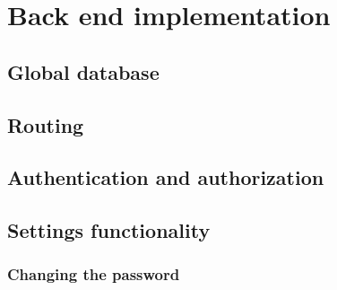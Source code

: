 \chapter{Back end implementation}
\label{ch:back_end_implementation}





\section{Global database}
\label{sec:global_database}





\section{Routing}
\label{sec:routing}





\section{Authentication and authorization}
\label{sec:authentication_and_authorization}





\section{Settings functionality}
\label{sec:settings_functionality}



\subsection{Changing the password}
\label{subsec:changing_the_password}



